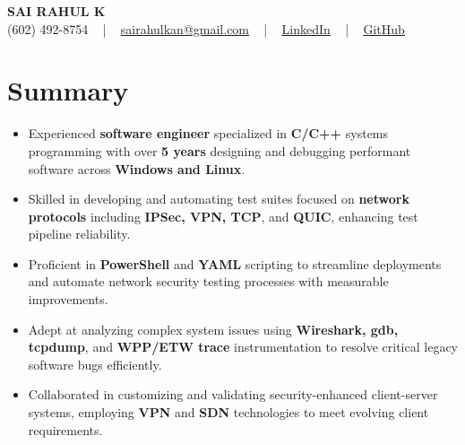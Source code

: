 \documentclass[letterpaper,11pt]{article}
\newcommand{\resumeItem}[1]{
  \item\footnotesize{
    {#1 \vspace{-2pt}}
  }
}
\newcommand{\resumeItemListStart}{\begin{itemize}[leftmargin=*]}
\newcommand{\resumeItemListEnd}{\end{itemize}\vspace{-5pt}}
\begin{document}
\begin{center}
    {\fontsize{14pt}{12pt}\selectfont \textbf{\MakeUppercase{Sai Rahul K}}}\\ \vspace{2pt}
    \fontsize{10pt}{12pt}\selectfont (602) 492-8754 ~ | ~ \href{mailto:sairahulkan@gmail.com}{sairahulkan@gmail.com} ~ | ~
    \href{https://www.linkedin.com/in/rq123/}{\color{blue}\underline{LinkedIn}} ~ | ~
    \href{https://github.com/kanrahuldo}{\color{blue}\underline{GitHub}}~
    \vspace{-8pt}
\end{center}

\section{Summary}
\fontsize{9pt}{10pt}\selectfont
\resumeItemListStart
    \resumeItem{Experienced \textbf{software engineer} specialized in \textbf{C/C++} systems programming with over \textbf{5 years} designing and debugging performant software across \textbf{Windows and Linux}.} \vspace{-3pt}
    \resumeItem{Skilled in developing and automating test suites focused on \textbf{network protocols} including \textbf{IPSec, VPN, TCP}, and \textbf{QUIC}, enhancing test pipeline reliability.} \vspace{-3pt}
    \resumeItem{Proficient in \textbf{PowerShell} and \textbf{YAML} scripting to streamline deployments and automate network security testing processes with measurable improvements.} \vspace{-3pt}
    \resumeItem{Adept at analyzing complex system issues using \textbf{Wireshark, gdb, tcpdump}, and \textbf{WPP/ETW trace} instrumentation to resolve critical legacy software bugs efficiently.} \vspace{-3pt}
    \resumeItem{Collaborated in customizing and validating security-enhanced client-server systems, employing \textbf{VPN} and \textbf{SDN} technologies to meet evolving client requirements.}
\resumeItemListEnd
\vspace{-6pt}
\end{document}
